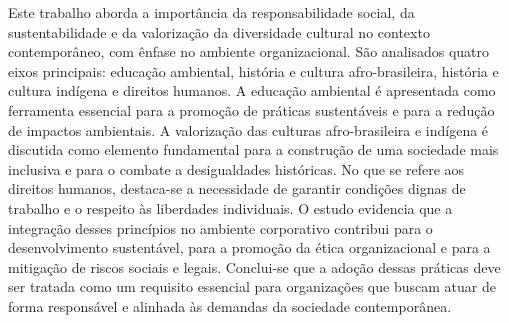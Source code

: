 \documentclass[
    12pt
    ,oneside
    ,a4paper
    ,chapter=TITLE
    ,section=TITLE
    ,sumario=abnt-6027-2012]{abntex2}
\begin{document}

\imprimircapa
\imprimirfolhaderosto

\begin{resumo}
Este trabalho aborda a importância da responsabilidade social, da sustentabilidade e da valorização da diversidade cultural no contexto contemporâneo, com ênfase no ambiente organizacional. São analisados quatro eixos principais: educação ambiental, história e cultura afro-brasileira, história e cultura indígena e direitos humanos. A educação ambiental é apresentada como ferramenta essencial para a promoção de práticas sustentáveis e para a redução de impactos ambientais. A valorização das culturas afro-brasileira e indígena é discutida como elemento fundamental para a construção de uma sociedade mais inclusiva e para o combate a desigualdades históricas. No que se refere aos direitos humanos, destaca-se a necessidade de garantir condições dignas de trabalho e o respeito às liberdades individuais. O estudo evidencia que a integração desses princípios no ambiente corporativo contribui para o desenvolvimento sustentável, para a promoção da ética organizacional e para a mitigação de riscos sociais e legais. Conclui-se que a adoção dessas práticas deve ser tratada como um requisito essencial para organizações que buscam atuar de forma responsável e alinhada às demandas da sociedade contemporânea.

\end{resumo}

\sumario

\textual

\end{document}
